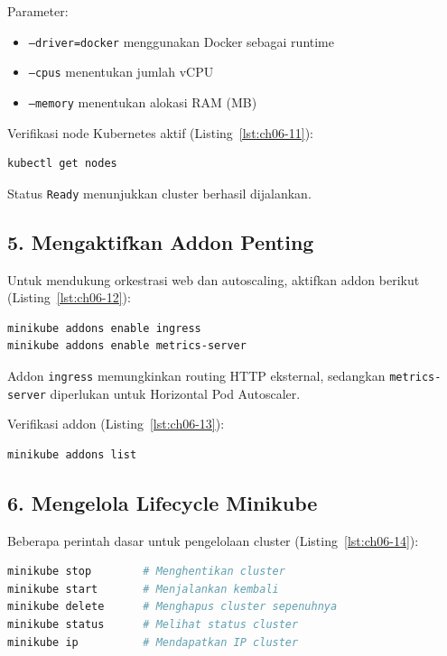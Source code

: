 Parameter:
\begin{itemize}
    \item \texttt{--driver=docker} menggunakan Docker sebagai runtime
    \item \texttt{--cpus} menentukan jumlah vCPU
    \item \texttt{--memory} menentukan alokasi RAM (MB)
\end{itemize}

Verifikasi node Kubernetes aktif (Listing~\ref{lst:ch06-11}):

\begin{lstlisting}[language=bash, caption={Memeriksa objek Kubernetes}, label={lst:ch06-11}]
kubectl get nodes
\end{lstlisting}

Status \texttt{Ready} menunjukkan cluster berhasil dijalankan.

\subsection*{5. Mengaktifkan Addon Penting}

Untuk mendukung orkestrasi web dan autoscaling, aktifkan addon berikut (Listing~\ref{lst:ch06-12}):

\begin{lstlisting}[language=bash, caption={Perintah minikube addons enable ingress}, label={lst:ch06-12}]
minikube addons enable ingress
minikube addons enable metrics-server
\end{lstlisting}

Addon \texttt{ingress} memungkinkan routing HTTP eksternal, sedangkan \texttt{metrics-server} diperlukan untuk Horizontal Pod Autoscaler.

Verifikasi addon (Listing~\ref{lst:ch06-13}):

\begin{lstlisting}[language=bash, caption={Perintah minikube addons list}, label={lst:ch06-13}]
minikube addons list
\end{lstlisting}

\subsection*{6. Mengelola Lifecycle Minikube}

Beberapa perintah dasar untuk pengelolaan cluster (Listing~\ref{lst:ch06-14}):

\begin{lstlisting}[language=bash, caption={Mengelola klaster Minikube}, label={lst:ch06-14}]
minikube stop        # Menghentikan cluster
minikube start       # Menjalankan kembali
minikube delete      # Menghapus cluster sepenuhnya
minikube status      # Melihat status cluster
minikube ip          # Mendapatkan IP cluster
\end{lstlisting}


